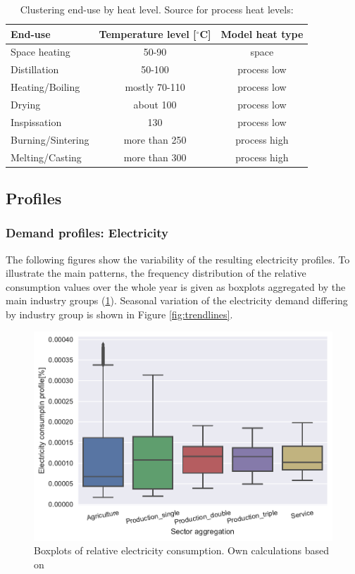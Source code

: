 \documentclass[review]{elsarticle}
\begin{document}
\begin{table}
\begin{tabular}{l | c | c}
End-use & Temperature level [$^{\circ}$C] & Model heat type\\
\hline \hline
Space heating & 50-90 & space  \\ 
Distillation & 50-100 & process low \\
Heating/Boiling & mostly 70-110 & process low \\
Drying & about 100 & process low \\
Inspissation & 130 & process low \\ 
Burning/Sintering & more than 250 & process high \\ 
Melting/Casting & more than 300 & process high  
\end{tabular}
\caption{Clustering end-use by heat level. Source for process heat levels: \cite{VM2015}}
\end{table}


\subsection{Profiles}
\subsubsection{Demand profiles: Electricity}

The following figures show the variability of the resulting electricity profiles. To illustrate the main patterns, the frequency distribution of the relative consumption values over the whole year is given as boxplots aggregated by the main industry groups (\ref{fig:boxplots}). Seasonal variation of the electricity demand differing by industry group is shown in Figure \ref{fig:trendlines}.

\begin{figure}[H]
\centering
\includegraphics[width=\linewidth]{Img/profiles/boxplots.pdf}
\caption{Boxplots of relative electricity consumption. Own calculations based on \cite{Energinet.dk,NordPool2016,ElforbrugsPanelerne2015,Andersen2013a,Andersen2013b,VM2015}}
\label{fig:boxplots} 
\end{figure}
\end{document}
